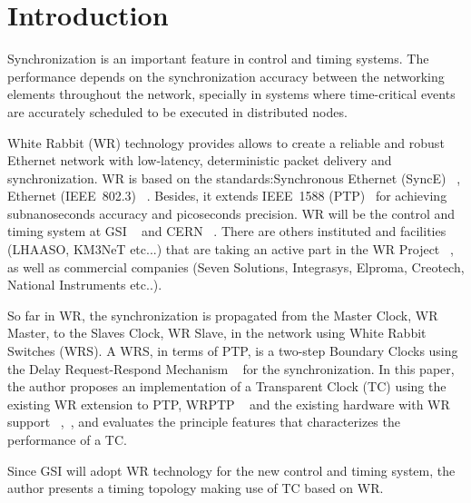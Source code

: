 \section{Introduction}

Synchronization is an important feature in control and timing
systems. The performance depends on the synchronization accuracy between 
the networking elements throughout the network, specially in systems 
where time-critical events are accurately scheduled to be executed in
distributed nodes. 

White Rabbit (WR) technology provides allows to create a reliable and robust Ethernet network with low-latency, 
deterministic packet delivery and synchronization. WR is based on the standards:Synchronous Ethernet 
(SyncE) ~\cite{biblio:synch}, Ethernet (IEEE~802.3) ~\cite{biblio:ethernet}. Besides, it extends IEEE~1588 
(PTP)~\cite{biblio:ptp} for achieving subnanoseconds accuracy and picoseconds precision.
WR will be the control and timing system at GSI ~\cite{biblio:FAIRtimingSystem} and CERN ~\cite{biblio:cernWr}. 
There are others instituted and facilities  (LHAASO, KM3NeT etc...) that are taking an active part in 
the WR Project ~\cite{biblio:wrproj}, as well as commercial companies (Seven Solutions, Integrasys, Elproma, 
Creotech, National Instruments etc..).

So far in WR, the synchronization is propagated from the Master Clock, WR Master, to the
Slaves Clock, WR Slave, in the network using White Rabbit Switches (WRS). A WRS,
in terms of PTP, is a two-step Boundary Clocks using the Delay Request-Respond Mechanism ~\cite{biblio:ptp}  
for the synchronization. In this paper, the author proposes an implementation
of a Transparent Clock (TC) using the existing WR extension to PTP, WRPTP ~\cite{biblio:wrptp} 
and the existing hardware with WR support ~\cite{biblio:spec},~\cite{biblio:wrswitch}, 
and evaluates the principle features that characterizes the performance of a TC. 

Since GSI will adopt WR technology for the new control and timing system, the
author presents a timing topology making use of TC based on WR. 

